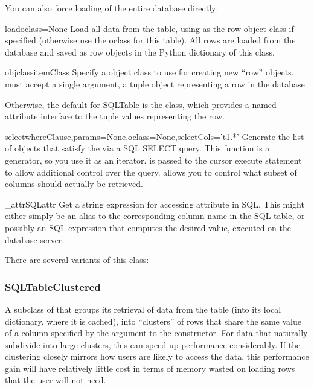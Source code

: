 \documentclass{howto}
\begin{document}
You can also force loading of the entire database directly:
\begin{funcdesc}{load}{oclass=None}
  Load all data from the table, using  as the row object
  class if specified (otherwise use the oclass for this table).
  All rows are loaded from the database and saved as row objects
  in the Python dictionary of this class.
\end{funcdesc}

\begin{funcdesc}{objclass}{itemClass}
  Specify a object class to use for creating new ``row'' objects.
   must accept a single argument, a tuple object representing
  a row in the database.  

  Otherwise, the default  for SQLTable is
  the  class, which provides a named attribute interface
  to the tuple values representing the row.
\end{funcdesc}

\begin{funcdesc}{select}{whereClause,params=None,oclass=None,selectCols='t1.*'}
  Generate the list of objects that satisfy the 
  via a SQL SELECT query.  This function is a generator, so you
  use it as an iterator.   is passed to the
  cursor execute statement to allow additional control over
  the query.   allows you to control what subset of
  columns should actually be retrieved.
\end{funcdesc}

\begin{funcdesc}{_attrSQL}{attr}
  Get a string expression for accessing attribute  in SQL.
  This might either simply be an alias to the corresponding column
  name in the SQL table, or possibly an SQL expression that computes
  the desired value, executed on the database server.
\end{funcdesc}



There are several variants of this class:
\subsubsection{SQLTableClustered}
A subclass of  that groups its retrieval
of data from the table (into its local dictionary, where it
is cached), into ``clusters'' of rows that share the same value of
a column specified by the  argument to the 
constructor.  For data that naturally subdivide into large clusters,
this can speed up performance considerably.  If the clustering
closely mirrors how users are likely to access the data, this
performance gain will have relatively little cost in terms
of memory wasted on loading rows that the user will not need.
\end{document}
